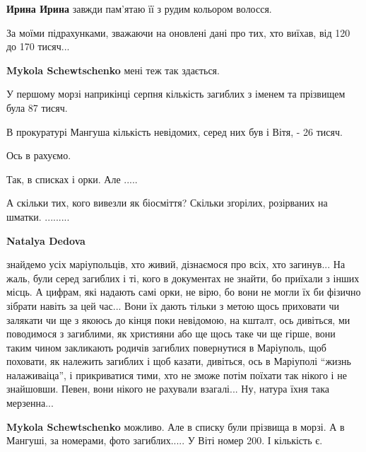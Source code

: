 \begin{multicols}{2}
\begin{itemize}
\begin{itemize} %
\textbf{Ирина Ирина} завжди пам'ятаю її з рудим кольором волосся.
\end{itemize} %


За моїми підрахунками, зважаючи на оновлені дані про тих, хто виїхав, від 120
до 170 тисяч...

\begin{itemize} %
\textbf{Mykola Schewtschenko} мені теж так здається.

У першому морзі наприкінці серпня кількість загиблих з іменем та прізвищем була
87 тисяч.

В прокуратурі Мангуша кількість невідомих, серед них був і Вітя, - 26 тисяч.

Ось в рахуємо.

Так, в списках і орки. Але .....

А скільки тих, кого вивезли як біосміття? Скільки згорілих, розірваних на
шматки. .........

\textbf{Natalya Dedova} 

знайдемо усіх маріупольців, хто живий, дізнаємося про всіх, хто загинув... На
жаль, були серед загиблих і ті, кого в документах не знайти, бо приїхали з
інших місць. А цифрам, які надають самі орки, не вірю, бо вони не могли їх би
фізично зібрати навіть за цей час... Вони їх дають тільки з метою щось
приховати чи залякати чи ще з якоюсь до кінця поки невідомою, на кшталт, ось
дивіться, ми поводимося з загиблими, як християни або ще щось таке чи ще гірше,
вони таким чином закликають родичів загиблих повернутися в Маріуполь, щоб
поховати, як належить загиблих і щоб казати, дивіться, ось в Маріуполі \enquote{жизнь
налаживаіца}, і прикриватися тими, хто не зможе потім поїхати так нікого і не
знайшовши. Певен, вони нікого не рахували взагалі... Ну, натура їхня така
мерзенна...

\textbf{Mykola Schewtschenko} можливо.
Але в списку були прізвища в морзі. А в Мангуші, за номерами, фото загиблих..... У Віті номер 200. І кількість є.
\end{itemize} %



\end{itemize} %

\end{multicols} %

